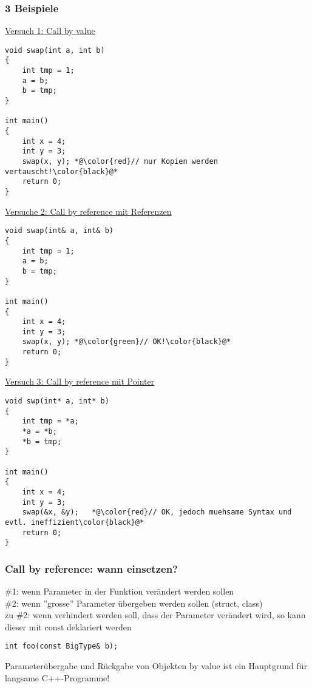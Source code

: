 \subsubsection{3 Beispiele\hfill}
\label{sec:unterunterabschnitt}
\underline{Versuch 1: Call by value}
\noindent
\begin{minipage}{\linewidth}
\begin{lstlisting}
void swap(int a, int b)
{
	int tmp = 1;
	a = b;
	b = tmp;
}

int main()
{
	int x = 4;
	int y = 3;
	swap(x, y);	*@\color{red}// nur Kopien werden vertauscht!\color{black}@*
	return 0;
}
\end{lstlisting}
\end{minipage}
\underline{Versuche 2: Call by reference mit Referenzen}
\noindent
\begin{minipage}{\linewidth}
\begin{lstlisting}
void swap(int& a, int& b)
{
	int tmp = 1;
	a = b;
	b = tmp;
}

int main()
{
	int x = 4;
	int y = 3;
	swap(x, y);	*@\color{green}// OK!\color{black}@*
	return 0;
}
\end{lstlisting}
\end{minipage}
\underline{Versuch 3: Call by reference mit Pointer}
\noindent
\begin{minipage}{\linewidth}
\begin{lstlisting}
void swp(int* a, int* b)
{
	int tmp = *a;
	*a = *b;
	*b = tmp;
}

int main()
{
	int x = 4;
	int y = 3;
	swap(&x, &y);	*@\color{red}// OK, jedoch muehsame Syntax und evtl. ineffizient\color{black}@*
	return 0;
}
\end{lstlisting}
\end{minipage}

\subsubsection{Call by reference: wann einsetzen?\hfill}
\label{sec:unterunterabschnitt}
\#1: wenn Parameter in der Funktion verändert werden sollen\\
\#2: wenn ''grosse'' Parameter übergeben werden sollen (struct, class)\\
zu \#2: wenn verhindert werden soll, dass der Parameter verändert wird, so kann dieser mit const deklariert werden\\
\noindent
\begin{minipage}{\linewidth}
\begin{lstlisting}
int foo(const BigType& b);
\end{lstlisting}
\end{minipage}
\begin{achtung}
Parameterübergabe und Rückgabe von Objekten by value ist ein Hauptgrund für langsame C++-Programme!
\end{achtung}

